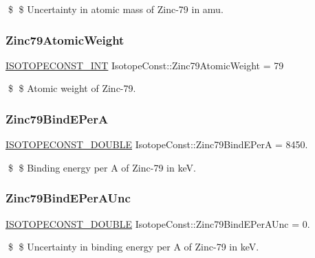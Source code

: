 \$ \$ Uncertainty in atomic mass of Zinc-\/79 in amu. \mbox{\label{group___isotope_const-_zinc-_zn79_gafe10a195c53a1ab44b3908d200f9b279}} 
\subsubsection{\texorpdfstring{Zinc79\+Atomic\+Weight}{Zinc79AtomicWeight}}
{\footnotesize\ttfamily \mbox{\hyperlink{group___isotope_const-_macros_ga5f18360b3e99483a35c32d789e62621c}{I\+S\+O\+T\+O\+P\+E\+C\+O\+N\+S\+T\+\_\+\+I\+NT}} Isotope\+Const\+::\+Zinc79\+Atomic\+Weight = 79}

\$ \$ Atomic weight of Zinc-\/79. \mbox{\label{group___isotope_const-_zinc-_zn79_ga94c470b70a18ec5480f3142d9d7170df}} 
\subsubsection{\texorpdfstring{Zinc79\+Bind\+E\+PerA}{Zinc79BindEPerA}}
{\footnotesize\ttfamily \mbox{\hyperlink{group___isotope_const-_macros_ga8f45a7272ce02c0b4c65c44636ed719a}{I\+S\+O\+T\+O\+P\+E\+C\+O\+N\+S\+T\+\_\+\+D\+O\+U\+B\+LE}} Isotope\+Const\+::\+Zinc79\+Bind\+E\+PerA = 8450.}

\$ \$ Binding energy per A of Zinc-\/79 in keV. \mbox{\label{group___isotope_const-_zinc-_zn79_gad7fa8d50a3af2ce418696839403695e9}} 
\subsubsection{\texorpdfstring{Zinc79\+Bind\+E\+Per\+A\+Unc}{Zinc79BindEPerAUnc}}
{\footnotesize\ttfamily \mbox{\hyperlink{group___isotope_const-_macros_ga8f45a7272ce02c0b4c65c44636ed719a}{I\+S\+O\+T\+O\+P\+E\+C\+O\+N\+S\+T\+\_\+\+D\+O\+U\+B\+LE}} Isotope\+Const\+::\+Zinc79\+Bind\+E\+Per\+A\+Unc = 0.}

\$ \$ Uncertainty in binding energy per A of Zinc-\/79 in keV. \mbox{\label{group___isotope_const-_zinc-_zn79_ga1af86ecbc0d2c5d8ce7807979b311268}} 
